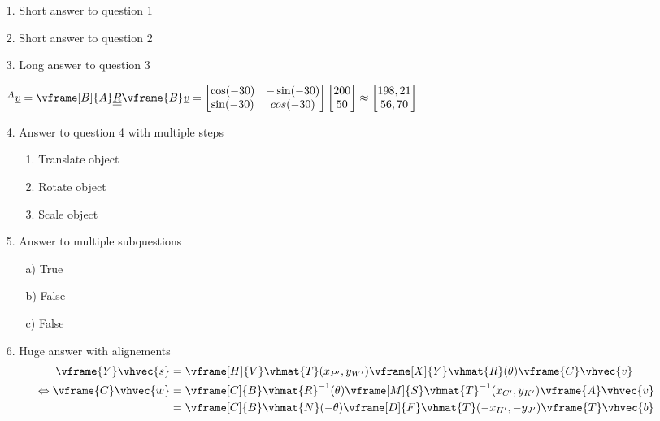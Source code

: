 \documentclass{gif7001}
\begin{document}
\vshort

\begin{enumerate}
    \item[1.] Short answer to question 1
    \item[2.] Short answer to question 2
    \item[3.] Long answer to question 3
    
    $^A\vvec{v} = \vframe[B]{A}\vmat{R} \vframe{B}\vvec{v} = \begin{bmatrix} \cos(-30) & -\sin(-30) \\ \sin(-30) & cos(-30) \end{bmatrix} \begin{bmatrix} 200 \\ 50 \end{bmatrix} \approx \begin{bmatrix} 198,21 \\ 56,70 \end{bmatrix}$
    \item[4.] Answer to question 4 with multiple steps
    \begin{enumerate}
        \item[1.] Translate object
        \item[2.] Rotate object
        \item[3.] Scale object
    \end{enumerate}
    \item[5.] Answer to multiple subquestions
    \begin{enumerate}
        \item[a)] True
        \item[b)] False
        \item[c)] False
    \end{enumerate}
    \item[6.] Huge answer with alignements
    \begin{align*}
        \vframe{Y}\vhvec{s} &= \vframe[H]{V}\vhmat{T}(x_{P'},y_{W'}) \vframe[X]{Y}\vhmat{R}(\theta) \vframe{C}\vhvec{v} \\
        \Leftrightarrow \vframe{C}\vhvec{w} &= \vframe[C]{B}\vhmat{R}^{-1}(\theta) \vframe[M]{S}\vhmat{T}^{-1}(x_{C'},y_{K'}) \vframe{A}\vhvec{v} \\
        &= \vframe[C]{B}\vhmat{N}(-\theta) \vframe[D]{F}\vhmat{T}(-x_{H'},-y_{J'}) \vframe{T}\vhvec{b} \\

\end{align*}
\end{enumerate}
\end{document}
